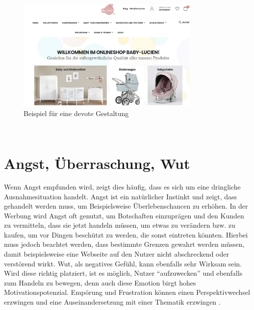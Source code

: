 \documentclass[./dokumentation.tex]{subfiles}
\begin{document}
\begin{figure}[h]
    \centering
    \includegraphics[width=0.8\textwidth]{bilder/unt.png}
    \caption{Beispiel für eine devote Gestaltung \cite{unt_bsp}}
    \label{fig8:unt}
\end{figure}\\
\section{Angst, Überraschung, Wut}
Wenn Angst empfunden wird, zeigt dies häufig, dass es sich um eine dringliche Ausnahmesituation handelt. Angst ist ein natürlicher Instinkt und zeigt, dass gehandelt werden muss, um Beispielsweise Überlebenschancen zu erhöhen. In der Werbung wird Angst oft genutzt, um Botschaften einzuprägen und den Kunden zu vermitteln, dass sie jetzt handeln müssen, um etwas zu verändern bzw. zu kaufen, um vor Dingen beschützt zu werden, die sonst eintreten könnten. Hierbei muss jedoch beachtet werden, dass bestimmte Grenzen gewahrt werden müssen, damit beispielsweise eine Webseite auf den Nutzer nicht abschreckend oder verstörend wirkt.
Wut, als negatives Gefühl, kann ebenfalls sehr Wirksam 
sein. Wird diese richtig platziert, ist es möglich, Nutzer “aufzuwecken” und ebenfalls zum Handeln zu bewegen, denn auch diese Emotion birgt hohes Motivationspotenzial. Empörung und Frustration können einen Perspektivwechsel erzwingen und eine Auseinandersetzung mit einer Thematik erzwingen  \cite{Schubert2016}.
\end{document}
